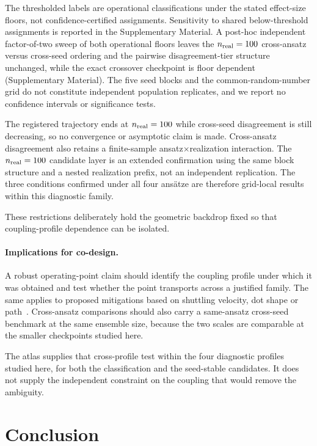 \documentclass[aip,jap,reprint,superscriptaddress,longbibliography,floatfix]{revtex4-2}
\begin{document}
The thresholded labels are operational classifications under the stated
effect-size floors, not confidence-certified assignments. Sensitivity to shared
below-threshold assignments is reported in the Supplementary Material. A
post-hoc independent factor-of-two sweep of both operational floors leaves the
$n_{\rm real}=100$ cross-ansatz versus cross-seed ordering and the pairwise
disagreement-tier structure unchanged, while the exact crossover checkpoint is
floor dependent (Supplementary Material). The five seed blocks and the
common-random-number grid do not constitute
independent population replicates, and we report no confidence intervals or
significance tests.

The registered trajectory ends at $n_{\rm real}=100$ while cross-seed
disagreement is still decreasing, so no convergence or asymptotic claim is
made. Cross-ansatz disagreement also retains a finite-sample
ansatz$\times$realization interaction. The $n_{\rm real}=100$ candidate layer is
an extended confirmation using the same block structure and a nested
realization prefix, not an independent replication. The three conditions
confirmed under all four ans\"atze are therefore grid-local results within this
diagnostic family.

These restrictions deliberately hold the geometric backdrop fixed so that
coupling-profile dependence can be isolated.

\paragraph{Implications for co-design.}
A robust operating-point claim should identify the coupling profile under which
it was obtained and test whether the point transports across a justified
family. The same applies to proposed mitigations based on shuttling velocity,
dot shape or path~\cite{losert_strategies_2024}. Cross-ansatz comparisons should
also carry a same-ansatz cross-seed benchmark at the same ensemble size,
because the two scales are comparable at the smaller checkpoints studied here.

The atlas supplies that cross-profile test within the four diagnostic profiles
studied here, for both the classification and the seed-stable candidates. It
does not supply the independent constraint on the coupling that would remove
the ambiguity.

\section{Conclusion}
\end{document}
